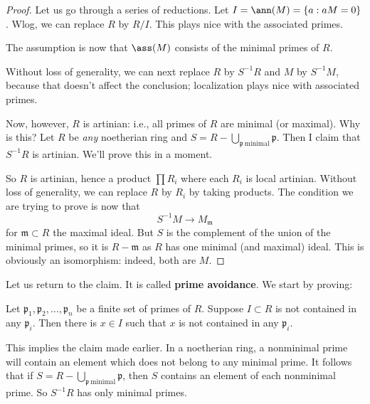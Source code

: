 \begin{proof} 
Let us go through a series of reductions. Let $I = \ann(M) = \left\{a: aM
= 0\right\}$. Wlog, we can replace $R $ by $R/I$. This plays nice with the
associated primes.

The assumption is now that $\ass(M)$ consists of the minimal
primes of $R$.

Without loss of generality, we can next replace $R$ by $S^{-1}R$ and $M$ by
$S^{-1}M$, because that doesn't affect the conclusion; localization plays nice
with associated primes. 

Now, however, $R$ is artinian: i.e., all primes of $R$ are minimal (or maximal). Why is this? 
Let $R$ be \emph{any} noetherian ring and $S = R - \bigcup_{\mathfrak{p} \
\mathrm{minimal}} \mathfrak{p}$. Then I claim that $S^{-1}R$ is artinian. We'll
prove this in a moment. 

So $R$ is artinian, hence a product $\prod R_i$ where each $R_i$ is local
artinian. Without loss of generality, we can replace $R$ by $R_i$ by taking
products. The condition we are trying to prove is now that
\[ S^{-1}M \to M_{\mathfrak{m}}  \]
for $\mathfrak{m} \subset R$ the maximal ideal. But $S$ is the complement of
the union of the minimal primes, so it is $R - \mathfrak{m}$ as $R$ has one
minimal (and maximal) ideal.  This is obviously an isomorphism: indeed, both
are $M$.
\end{proof} 
Let us return to the claim. It is called \textbf{prime avoidance}.
We start by proving:
\begin{proposition} 
Let $\mathfrak{p}_1, \mathfrak{p}_2, \dots, \mathfrak{p}_n$ be a finite set of
primes of $R$. Suppose $I \subset R$ is not contained in any $\mathfrak{p}_i$.
Then there is $x \in I$ such that $x $ is not contained in any $\mathfrak{p}_i$. 
\end{proposition} 
This implies the claim made earlier. In a noetherian ring, a nonminimal prime will contain an element
which does not belong to any minimal prime. It follows that if $S = R -
\bigcup_{\mathfrak{p} \ \mathrm{minimal}} \mathfrak{p}$, then $S$ contains an
element of each nonminimal prime. So $S^{-1}R$ has only minimal primes.

